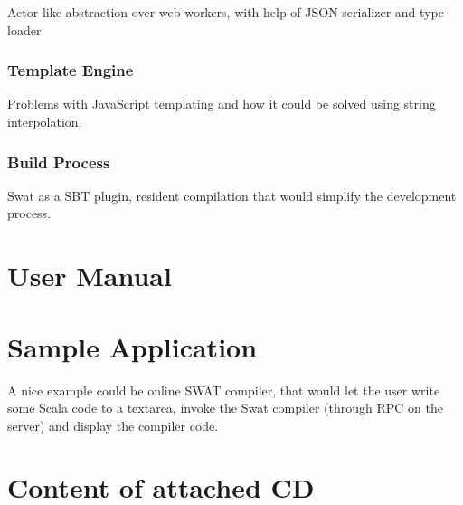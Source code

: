 \documentclass[12pt,a4paper]{report}
\begin{document}
Actor like abstraction over web workers, with help of JSON serializer and type-loader.

\subsection{Template Engine}

Problems with JavaScript templating and how it could be solved using string interpolation.

\subsection{Build Process}

Swat as a SBT plugin, resident compilation that would simplify the development process.



\def\bibname{Bibliography}







\appendix
\appendixpage
\addappheadtotoc

\chapter{User Manual}

\chapter{Sample Application}

A nice example could be online SWAT compiler, that would let the user write some Scala code to a textarea, invoke the Swat compiler (through RPC on the server) and display the compiler code.



\chapter{Content of attached CD}





\printnomenclature
\end{document}
